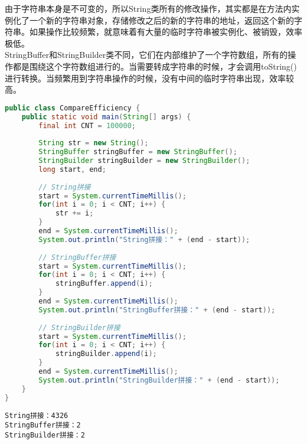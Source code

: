 由于字符串本身是不可变的，所以String类所有的修改操作，其实都是在方法内实例化了一个新的字符串对象，存储修改之后的新的字符串的地址，返回这个新的字符串。如果操作比较频繁，就意味着有大量的临时字符串被实例化、被销毁，效率极低。\\

StringBuffer和StringBuilder类不同，它们在内部维护了一个字符数组，所有的操作都是围绕这个字符数组进行的。当需要转成字符串的时候，才会调用toString()进行转换。当频繁用到字符串操作的时候，没有中间的临时字符串出现，效率较高。\\


\begin{lstlisting}[language=Java]
public class CompareEfficiency {
    public static void main(String[] args) {
        final int CNT = 100000;
        
        String str = new String();
        StringBuffer stringBuffer = new StringBuffer();
        StringBuilder stringBuilder = new StringBuilder();
        long start, end;
        
        // String拼接
        start = System.currentTimeMillis();
        for(int i = 0; i < CNT; i++) {
            str += i;
        }
        end = System.currentTimeMillis();
        System.out.println("String拼接：" + (end - start));
        
        // StringBuffer拼接
        start = System.currentTimeMillis();
        for(int i = 0; i < CNT; i++) {
            stringBuffer.append(i);
        }
        end = System.currentTimeMillis();
        System.out.println("StringBuffer拼接：" + (end - start));
        
        // StringBuilder拼接
        start = System.currentTimeMillis();
        for(int i = 0; i < CNT; i++) {
            stringBuilder.append(i);
        }
        end = System.currentTimeMillis();
        System.out.println("StringBuilder拼接：" + (end - start));
    }
}
\end{lstlisting}

\begin{tcolorbox}
	\begin{verbatim}
String拼接：4326
StringBuffer拼接：2
StringBuilder拼接：2
	\end{verbatim}
\end{tcolorbox}

\newpage